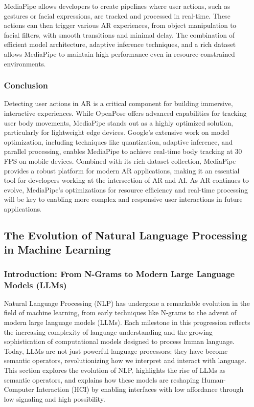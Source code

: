 MediaPipe allows developers to create pipelines where user actions, such as gestures or facial expressions, are tracked and processed in real-time.
These actions can then trigger various AR experiences, from object manipulation to facial filters, with smooth transitions and minimal delay.
The combination of efficient model architecture, adaptive inference techniques, and a rich dataset allows MediaPipe to maintain high performance even in resource-constrained environments.

\subsubsection{ Conclusion}

Detecting user actions in AR is a critical component for building immersive, interactive experiences.
While OpenPose offers advanced capabilities for tracking user body movements, MediaPipe stands out as a highly optimized solution, particularly for lightweight edge devices.
Google's extensive work on model optimization, including techniques like quantization, adaptive inference, and parallel processing, enables MediaPipe to achieve real-time body tracking at 30 FPS on mobile devices.
Combined with its rich dataset collection, MediaPipe provides a robust platform for modern AR applications, making it an essential tool for developers working at the intersection of AR and AI. As AR continues to evolve, MediaPipe’s optimizations for resource efficiency and real-time processing will be key to enabling more complex and responsive user interactions in future applications.


\subsection{ The Evolution of Natural Language Processing in Machine Learning}

\subsubsection{ Introduction: From N-Grams to Modern Large Language Models (LLMs)}

Natural Language Processing (NLP) has undergone a remarkable evolution in the field of machine learning, from early techniques like N-grams \cite{Mar13} to the advent of modern large language models (LLMs).
Each milestone in this progression reflects the increasing complexity of language understanding and the growing sophistication of computational models designed to process human language.
Today, LLMs are not just powerful language processors; they have become semantic operators, revolutionizing how we interpret and interact with language. This section explores the evolution of NLP, highlights the rise of LLMs as semantic operators, and explains how these models are reshaping Human-Computer Interaction (HCI) by enabling interfaces with low affordance through low signaling and high possibility.

